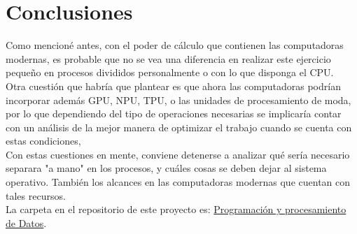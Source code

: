 \documentclass{assignment}
\begin{document}
	\section*{Conclusiones}
		Como mencioné antes, con el poder de cálculo que contienen las computadoras modernas, es probable que no se vea una diferencia en realizar este ejercicio pequeño en procesos divididos personalmente o con lo que disponga el CPU.\\
		Otra cuestión que habría que plantear es que ahora las computadoras podrían incorporar además GPU, NPU, TPU, o las unidades de procesamiento de moda, por lo que dependiendo del tipo de operaciones necesarias se implicaría contar con un análisis de la mejor manera de optimizar el trabajo cuando se cuenta con estas condiciones,\\
		Con estas cuestiones en mente, conviene detenerse a analizar qué sería necesario separara "a mano" en los procesos, y cuáles cosas se deben dejar al sistema operativo. También los alcances en las computadoras modernas que cuentan con tales recursos.\\
		La carpeta en el repositorio de este proyecto es: \href{https://github.com/clivan/Programacion_y_Procesamiento_de_Datos_Infotec/5B}{Programación y procesamiento de Datos}.	
\end{document}

